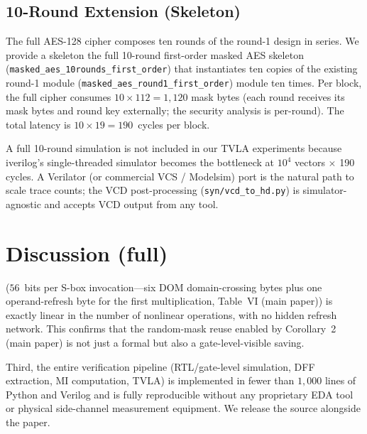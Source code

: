 \documentclass[journal,onecolumn]{IEEEtran}
\begin{document}
\subsection*{10-Round Extension (Skeleton)}

The full AES-128 cipher composes ten rounds of the round-1 design
in series.  We provide a skeleton
the full 10-round first-order masked AES skeleton (\texttt{masked\_aes\_10rounds\_first\_order}) that
instantiates ten copies of the existing round-1 module (\texttt{masked\_aes\_round1\_first\_order})
module ten times.  Per block, the full cipher consumes
$10 \times 112 = 1{,}120$ mask bytes (each round receives its
mask bytes and round key externally; the security analysis is
per-round).
The total latency is $10 \times 19 = 190$~cycles per block.

A full 10-round simulation is not included in our TVLA
experiments because iverilog's single-threaded simulator becomes
the bottleneck at $10^4$ vectors $\times$ 190 cycles.  A
Verilator (or commercial VCS / Modelsim) port is the natural
path to scale trace counts; the VCD post-processing
(\texttt{syn/\allowbreak{}vcd\_\allowbreak{}to\_\allowbreak{}hd.py}) is simulator-agnostic and accepts
VCD output from any tool.


\section{Discussion (full)}
\label{app:discussion-full}

($56$~bits per S-box invocation---six DOM domain-crossing bytes plus
one operand-refresh byte for the first multiplication,
Table~VI (main paper)) is exactly linear in
the number of nonlinear operations, with no hidden refresh network.
This confirms that the random-mask reuse enabled by
Corollary~2 (main paper) is not just a formal but also a
gate-level-visible saving.

Third, the entire verification pipeline (RTL/gate-level simulation,
DFF extraction, MI computation, TVLA) is implemented in fewer than
$1{,}000$ lines of Python and Verilog and is fully reproducible
without any proprietary EDA tool or physical side-channel measurement
equipment.  We release the source alongside the paper.
\end{document}
